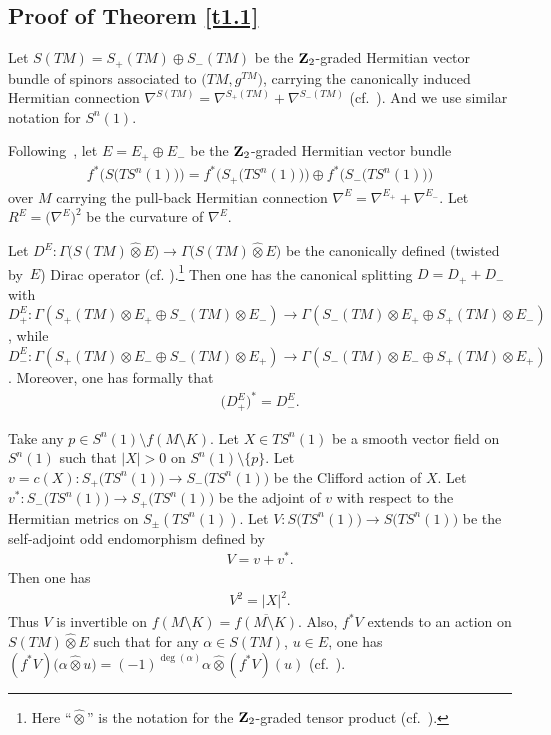 \subsection{Proof of Theorem \ref{t1.1}}\label{s1.2}

Let $S(TM)=S_+(TM)\oplus S_-(TM)$ be the ${\bf Z}_2$-graded Hermitian vector bundle of spinors associated to $\big(TM,g^{TM}\big)$, carrying the canonically induced Hermitian connection $\nabla^{S(TM)}=\nabla^{S_+(TM)}+\nabla^{S_-(TM)}$ (cf.~\cite{LaMi89}). And we use similar notation for $ S^n(1)$.

Following~\cite{L98}, let $E=E_+\oplus E_-$ be the ${\bf Z}_2$-graded Hermitian vector bundle
\begin{gather}\label{1.4b}
f^*\big(S\big(TS^n(1)\big)\big)=f^*\big(S_+\big(TS^n(1)\big)\big)\oplus f^*\big(S_-\big(TS^n(1)\big)\big)
\end{gather}
over $M$ carrying the pull-back Hermitian connection $\nabla^E=\nabla^{E_+}+\nabla^{E_-}$. Let $R^E=\big(\nabla^E\big)^2$ be the curvature of $\nabla^E$.

Let $D^E\colon \Gamma\big(S(TM)\widehat\otimes E\big)\rightarrow
\Gamma\big(S(TM)\widehat\otimes E\big)$ be the canonically defined (twisted by~$E$) Dirac operator (cf. \cite{LaMi89}).\footnote{Here ``$\widehat\otimes$'' is the notation for the ${\bf Z}_2$-graded tensor product (cf.~\cite{Q85}).} Then one has the canonical splitting $D=D_++D_-$ with $D^E_+\colon \Gamma(S_+(TM) \otimes E_+\oplus S_-(TM)\otimes E_-) \rightarrow \Gamma(S_-(TM) \otimes E_+\oplus S_+(TM)\otimes E_-) $, while $D^E_-\colon \Gamma(S_+(TM) \otimes E_-\oplus S_-(TM)\otimes E_+) \rightarrow \Gamma(S_-(TM) \otimes E_-\oplus S_+(TM)\otimes E_+) $. Moreover, one has formally that
\begin{gather*}%
\big(D^E_+\big)^*=D^E_-.
\end{gather*}

 Take any $p\in S^n(1)\setminus {f(M\setminus K)}$. Let $X\in TS^n(1)$ be a smooth vector field on $S^n(1)$ such that $|X|>0$ on $S^n(1)\setminus \{p\}$. Let $v=c(X)\colon S_+\big(TS^n(1)\big)\rightarrow S_-\big(TS^n(1)\big)$ be the Clifford action of $X$. Let $v^*\colon S_-\big(TS^n(1)\big)\rightarrow S_+\big(TS^n(1)\big)$ be the adjoint of $v$ with respect to the Hermitian metrics on $S_\pm(TS^n(1))$. Let $V\colon S\big(TS^n(1)\big)\rightarrow S\big(TS^n(1)\big)$ be the self-adjoint odd endomorphism defined by
\begin{gather}\label{1.6}
V=v+v^*.
\end{gather}
Then one has
\begin{gather}\label{1.6a}V^2=|X|^2.
\end{gather}
Thus $V$ is invertible on $ {f(M\setminus K)} = \overline {f(M\setminus K)} $. Also, $f^*V$ extends to an action on $S(TM)\widehat\otimes E$ such that for any $\alpha\in S(TM)$, $u\in E$, one has $(f^*V )\big(\alpha\widehat \otimes u\big)=(-1)^{\deg (\alpha)}\alpha\widehat\otimes (f^*V)(u)$ (cf.~\cite{Q85}).

